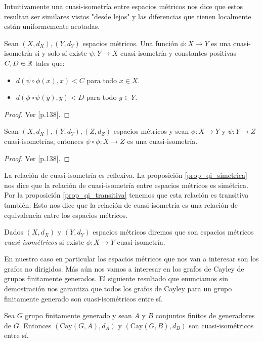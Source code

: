 \documentclass[tesis.tex]{subfiles}
\begin{document}
Intuitivamente una cuasi-isometría entre espacios métricos nos dice que estos resultan ser  similares vistos "desde lejos" y las diferencias que tienen localmente están uniformemente acotadas. 

\medskip
\begin{prop}\label{prop_qi_simetrica}
	Sean $(X,d_X),(Y,d_Y)$ espacios métricos. 
	Una función $\phi:X \to Y$ es una cuasi-isometría si y solo sí existe 
	$\psi:Y \to X$ cuasi-isometría y constantes positivas $C,D \in \mathbb{R}$ tales que:
	\begin{itemize}
		\item $d(\psi \circ \phi (x), x) < C$ para todo $x \in X$.
		\item $d(\phi \circ \psi (y), y) < D$ para todo $y \in Y$. 
	\end{itemize}
\end{prop}
\begin{proof}
	Ver \cite{bridson2013metric}[p.138].
\end{proof}

\begin{prop}\label{prop_qi_transitiva}
	Sean $(X,d_X),(Y,d_Y), (Z, d_{Z})$ espacios métricos y sean $\phi:X \to Y$ y $\psi:Y \to Z$ cuasi-isometrías,
	 entonces $\psi \circ \phi: X \to Z$ es una cuasi-isometría.
\end{prop}
\begin{proof}
	Ver \cite{bridson2013metric}[p.138].
\end{proof}




La relación de cuasi-isometría es reflexiva.
La proposición \ref{prop_qi_simetrica} nos dice que la relación de cuasi-isometría entre espacios métricos es simétrica.
Por la proposición \ref{prop_qi_transitiva} tenemos que esta relación es transitiva también. 
Esto nos dice que la relación de cuasi-isometría es una relación de equivalencia entre los espacios métricos.
\begin{deff}
	Dados $(X,d_{X})$ y $(Y,d_{Y})$ espacios métricos diremos que son espacios métricos \emph{cuasi-isométricos} si existe $\phi:X \to Y$ cuasi-isometría. 
\end{deff}



En nuestro caso en particular los espacios métricos que nos van a interesar son los grafos no dirigidos.
Más aún nos vamos a interesar en los grafos de Cayley de grupos finitamente generados.
El siguiente resultado que enunciamos sin demostración nos garantiza que todos los grafos de Cayley para un grupo finitamente generado son cuasi-isométricos entre sí.
\begin{prop}
	Sea $G$ grupo finitamente generado y sean $A$ y $B$ conjuntos finitos de generadores de $G$. 
	Entonces $(\text{Cay}(G,A), d_{A})$ y $(\text{Cay}(G, B), d_{B})$ son cuasi-isométricos entre sí.
\end{prop}
\end{document}
